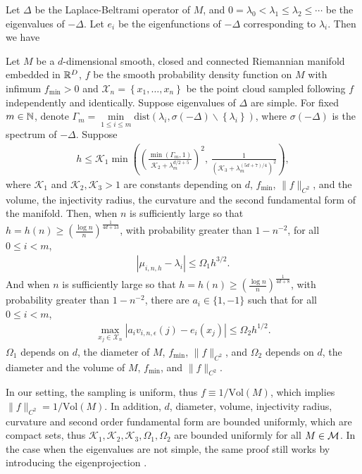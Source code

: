 Let $\Delta$ be the Laplace-Beltrami operator of $M$, and $0=\lambda_0<\lambda_1\leq \lambda_2 \leq \cdots$ be the eigenvalues of $-\Delta$. Let $e_i$ be the eigenfunctions of $-\Delta$ corresponding to $\lambda_i$. Then we have
\begin{theorem}  \cite[Thm. 2]{DUNSON2021282}
	\label{thm:conver_rate}
Let $M$ be a $d$-dimensional smooth, closed and connected Riemannian manifold embedded in $\mathbb{R}^D$, $f$ be the smooth probability density function on $M$ with infimum $f_{\min}>0$ and $\mathcal{X}_n=\left\{x_1, \dots,x_n\right\}$ be the point cloud sampled following $f$ independently and identically. Suppose eigenvalues of $\Delta$ are simple. For fixed $m\in \mathbb{N}$, denote $\Gamma_m=\min\limits_{1\leq i \leq m} \text{dist}(\lambda_i, \sigma(-\Delta)\backslash\left\{\lambda_i\right\})$, where $\sigma(-\Delta)$ is the spectrum of $-\Delta$. Suppose 
\begin{align}
	h \leq \mathcal{K}_1 \min \left(\left(\frac{\min(\mathsf\Gamma_m,1)}{\mathcal{K}_2+\lambda_m^{d/2+5}}\right)^2,\, \frac{1}{(\mathcal{K}_3+\lambda_m^{(5d+7)/4})^2}\right),
\end{align}
where $\mathcal{K}_1$ and $\mathcal{K}_2, \mathcal{K}_3>1$  are constants depending on $d$, $f_{\min}$, $\|f\|_{C^2}$, and the volume, the injectivity radius, the curvature and the second fundamental form of the manifold.
Then, when $n$ is sufficiently large so that $h=h(n) \geq (\frac{\log n}{n})^{\frac{1}{4d+13}}$, with probability greater than $1-n^{-2}$, for all $0 \leq i < m$, 
\begin{align}
	|\mu_{i,n,h}-\lambda_{i}|\leq \Omega_1 h^{3/2}. 
\end{align}
And when $n$ is sufficiently large so that $h=h(n)\geq (\frac{\log n}{n})^{\frac{1}{4d+8}} $, with probability greater than $1-n^{-2}$, there are $a_i \in \{1,-1\}$ such that for all $0 \leq i <  m$, 
	\begin{align}
		\max_{x_j \in \mathcal{X}_n}|a_i v_{i,n,\epsilon}(j)-e_{i}(x_j)|\leq  \Omega_2 h^{1/2}.
	\end{align}
$\Omega_1$ depends on $d$, the diameter of $M$, $f_{\min}$, $\|f\|_{C^2}$, and $\Omega_2$ depends on $d$, the diameter and the volume of $M$, $f_{\min}$, and $\|f\|_{C^2}$.
\end{theorem} 
\begin{remark}
In our setting, the sampling is uniform, thus $f \equiv 1/\text{Vol}(M)$,  which implies $\|f\|_{C^2} = 1/\text{Vol}(M)$. In addition, $d$, diameter, volume, injectivity radius, curvature and second order fundamental form are bounded uniformly, which are compact sets, thus $\mathcal{K}_1, \mathcal{K}_2, \mathcal{K}_3, \Omega_1,\Omega_2$ are bounded uniformly for all $M \in \mathcal{M}$. In the case when the eigenvalues are not simple, the same proof still works by introducing the eigenprojection \cite{spectralapproximationoflinear}.
\end{remark}        

